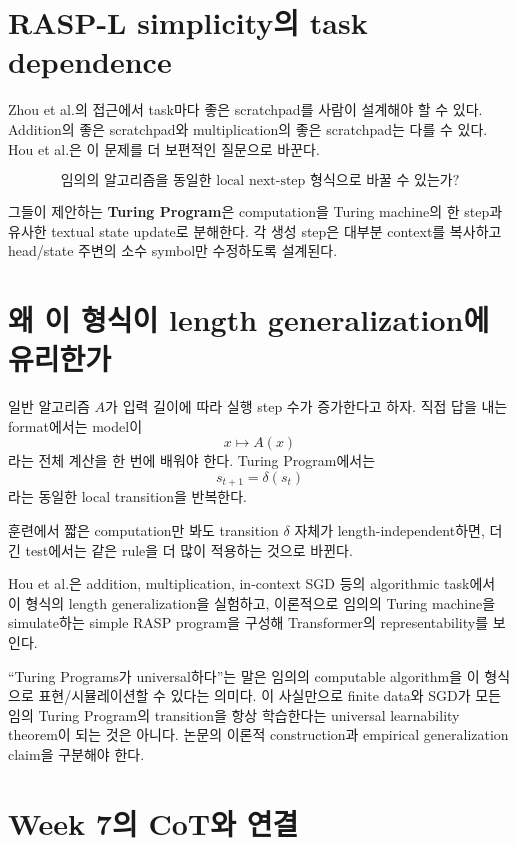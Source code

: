 \documentclass[11pt,a4paper,oneside,openany]{memoir}
\theoremstyle{definition}
\begin{document}
\section{RASP-L simplicity의 task dependence}

Zhou et al.의 접근에서 task마다 좋은 scratchpad를 사람이 설계해야 할 수 있다.
Addition의 좋은 scratchpad와 multiplication의 좋은 scratchpad는 다를 수 있다.
Hou et al.은 이 문제를 더 보편적인 질문으로 바꾼다.

\[
\boxed{\text{임의의 알고리즘을 동일한 local next-step 형식으로 바꿀 수 있는가?}}
\]

그들이 제안하는 \textbf{Turing Program}은 computation을 Turing machine의 한 step과 유사한 textual state update로 분해한다.
각 생성 step은 대부분 context를 복사하고 head/state 주변의 소수 symbol만 수정하도록 설계된다.

\section{왜 이 형식이 length generalization에 유리한가}

일반 알고리즘 $A$가 입력 길이에 따라 실행 step 수가 증가한다고 하자.
직접 답을 내는 format에서는 model이
\[
x\mapsto A(x)
\]
라는 전체 계산을 한 번에 배워야 한다.
Turing Program에서는
\[
s_{t+1}=\delta(s_t)
\]
라는 동일한 local transition을 반복한다.

훈련에서 짧은 computation만 봐도 transition $\delta$ 자체가 length-independent하면,
더 긴 test에서는 같은 rule을 더 많이 적용하는 것으로 바뀐다.

Hou et al.은 addition, multiplication, in-context SGD 등의 algorithmic task에서 이 형식의 length generalization을 실험하고,
이론적으로 임의의 Turing machine을 simulate하는 simple RASP program을 구성해 Transformer의 representability를 보인다.

\begin{warningbox}
``Turing Programs가 universal하다''는 말은 임의의 computable algorithm을 이 형식으로 표현/시뮬레이션할 수 있다는 의미다.
이 사실만으로 finite data와 SGD가 모든 임의 Turing Program의 transition을 항상 학습한다는 universal learnability theorem이 되는 것은 아니다.
논문의 이론적 construction과 empirical generalization claim을 구분해야 한다.
\end{warningbox}

\section{Week 7의 CoT와 연결}
\end{document}
